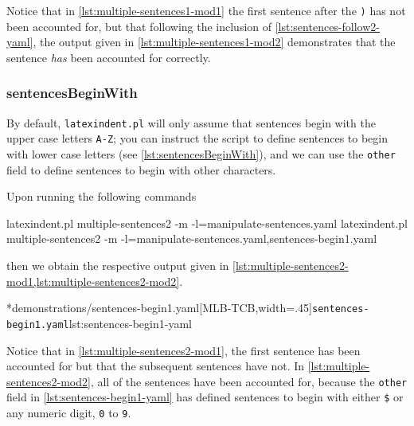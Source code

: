 	Notice that in \cref{lst:multiple-sentences1-mod1} the first sentence after the
	\texttt{)} has not been accounted for, but that following the inclusion
	of \cref{lst:sentences-follow2-yaml}, the output given in \cref{lst:multiple-sentences1-mod2}
	demonstrates that the sentence \emph{has} been accounted for correctly.

\subsubsection{sentencesBeginWith}
	By default, \texttt{latexindent.pl} will only assume that sentences begin with the
	upper case letters \texttt{A-Z}; you can instruct the script to define
	sentences to begin with lower case letters (see \cref{lst:sentencesBeginWith}), and we can
	use the \texttt{other} field to define sentences to begin with other
	characters.


	Upon running the following commands
	\begin{widepage}
		\begin{commandshell}
latexindent.pl multiple-sentences2 -m -l=manipulate-sentences.yaml
latexindent.pl multiple-sentences2 -m -l=manipulate-sentences.yaml,sentences-begin1.yaml
\end{commandshell}
	\end{widepage}
	then we obtain the respective output given in \cref{lst:multiple-sentences2-mod1,lst:multiple-sentences2-mod2}.

	\begin{cmhtcbraster}[
			raster force size=false,
			raster column 1/.style={add to width=1cm},
		]
		\cmhlistingsfromfile[style=yaml-LST]*{demonstrations/sentences-begin1.yaml}[MLB-TCB,width=.45\textwidth]{\texttt{sentences-begin1.yaml}}{lst:sentences-begin1-yaml}
	\end{cmhtcbraster}
	Notice that in \cref{lst:multiple-sentences2-mod1}, the first sentence has been accounted for but
	that the subsequent sentences have not. In \cref{lst:multiple-sentences2-mod2}, all of the
	sentences have been accounted for, because the \texttt{other} field in
	\cref{lst:sentences-begin1-yaml} has defined sentences to begin with either
	\lstinline!$! or any numeric digit, \texttt{0} to
	\texttt{9}.

